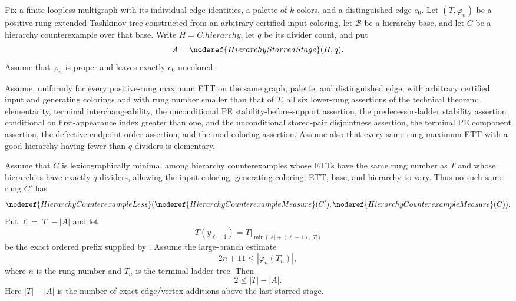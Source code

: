 \begin{lemma}
Fix a finite loopless multigraph with its individual edge identities, a
palette of $k$ colors, and a distinguished edge $e_0$.  Let
$(T,\varphi_n)$ be a positive-rung extended Tashkinov tree constructed
from an arbitrary certified input coloring, let $\mathcal B$ be a
hierarchy base, and let $C$ be a hierarchy counterexample over that base.
Write $H=C.\mathit{hierarchy}$, let $q$ be its divider count, and put
\[
 A=\noderef{HierarchyStarredStage}(H,q).
\]
Assume that $\varphi_n$ is proper and leaves exactly $e_0$ uncolored.

Assume, uniformly for every positive-rung maximum ETT on the same graph,
palette, and distinguished edge, with arbitrary certified input and
generating colorings and with rung number smaller than that of $T$, all
six lower-rung assertions of the technical theorem: elementarity,
terminal interchangeability, the unconditional PE stability-before-support
assertion, the predecessor-ladder stability assertion conditional on
first-appearance index greater than one, and the unconditional stored-pair
disjointness assertion, the terminal PE component assertion, the defective-endpoint
order assertion, and the mod-coloring assertion.  Assume also that every
same-rung maximum ETT with a good hierarchy having fewer than $q$
dividers is elementary.

Assume that $C$ is lexicographically minimal among hierarchy
counterexamples whose ETTs have the same rung number as $T$ and whose
hierarchies have exactly $q$ dividers, allowing the input coloring,
generating coloring, ETT, base, and hierarchy to vary.  Thus no such
same-rung $C'$ has
\[
 \noderef{HierarchyCounterexampleLess}
   (\noderef{HierarchyCounterexampleMeasure}(C'),
    \noderef{HierarchyCounterexampleMeasure}(C)).
\]
Put $\ell=|T|-|A|$ and let
\[
 T(y_{\ell-1})=
 T\big|_{\min\{|A|+(\ell-1),|T|\}}
\]
be the exact ordered prefix supplied by .
Assume the large-branch estimate
\[
 2n+11\leq |\overline\varphi_n(T_n)|,
\]
where $n$ is the rung number and $T_n$ is the terminal ladder tree.
Then
\[
                         2\leq |T|-|A|.
\]
Here $|T|-|A|$ is the number of exact edge/vertex additions above the
last starred stage.
\end{lemma}
